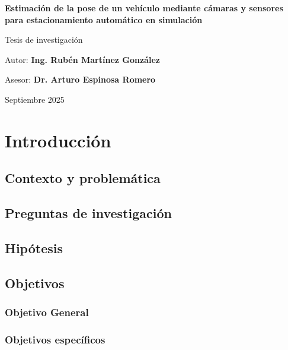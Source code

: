 \documentclass[10pt,letterpaper,final]{article}
\newcommand{\advisor}{Dr. Arturo Espinosa Romero}
\newcommand{\myauthor}{Ing. Rubén Martínez González}
\newcommand{\tesisInv}{Tesis de investigación}
\newcommand{\mydate}{Septiembre 2025}
\newcommand{\mytitle}{Estimación de la pose de un vehículo mediante cámaras y sensores para estacionamiento automático en simulación}
\begin{document}
\begin{titlepage}
    \vspace{1.5cm}
    {\LARGE\bfseries \mytitle \par}
    \vspace{1.5cm}
    {\Large \tesisInv \par}
    \vspace{1cm}
    {\large Autor: \textbf{\myauthor}\par}
    \vspace{0.5cm}
    {\large Asesor: \textbf{\advisor}\par}
    \vfill
    \vspace{0.5cm}
    {\large \mydate \par}
\end{titlepage}

\begin{abstract}
    
\end{abstract}
\clearpage


\tableofcontents
\listoffigures
\clearpage

\section{Introducción}


\subsection{Contexto y problemática}


\subsection{Preguntas de investigación}


\subsection{Hipótesis}


\subsection{Objetivos}
\subsubsection{Objetivo General}

\subsubsection{Objetivos específicos}

\end{document}
